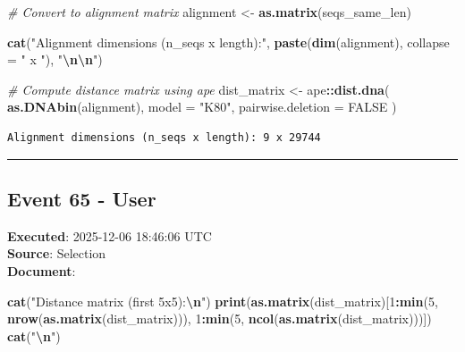 \documentclass[
  11pt,
]{article}
\newenvironment{Shaded}{\begin{snugshade}}{\end{snugshade}}
\newcommand{\AttributeTok}[1]{\textcolor[rgb]{0.13,0.29,0.53}{#1}}
\newcommand{\CommentTok}[1]{\textcolor[rgb]{0.56,0.35,0.01}{\textit{#1}}}
\newcommand{\ConstantTok}[1]{\textcolor[rgb]{0.56,0.35,0.01}{#1}}
\newcommand{\DecValTok}[1]{\textcolor[rgb]{0.00,0.00,0.81}{#1}}
\newcommand{\FunctionTok}[1]{\textcolor[rgb]{0.13,0.29,0.53}{\textbf{#1}}}
\newcommand{\NormalTok}[1]{#1}
\newcommand{\OtherTok}[1]{\textcolor[rgb]{0.56,0.35,0.01}{#1}}
\newcommand{\SpecialCharTok}[1]{\textcolor[rgb]{0.81,0.36,0.00}{\textbf{#1}}}
\newcommand{\StringTok}[1]{\textcolor[rgb]{0.31,0.60,0.02}{#1}}
\newenvironment{rpoutput}{\vspace{0.5em}\begin{snugshade}}{\end{snugshade}}
\begin{document}
\begin{Shaded}
\begin{Highlighting}[]
\CommentTok{\# Convert to alignment matrix}
\NormalTok{alignment }\OtherTok{\textless{}{-}} \FunctionTok{as.matrix}\NormalTok{(seqs\_same\_len)}

\FunctionTok{cat}\NormalTok{(}\StringTok{"Alignment dimensions (n\_seqs x length):"}\NormalTok{, }\FunctionTok{paste}\NormalTok{(}\FunctionTok{dim}\NormalTok{(alignment), }\AttributeTok{collapse =} \StringTok{" x "}\NormalTok{), }\StringTok{"}\SpecialCharTok{\textbackslash{}n\textbackslash{}n}\StringTok{"}\NormalTok{)}

\CommentTok{\# Compute distance matrix using ape}
\NormalTok{dist\_matrix }\OtherTok{\textless{}{-}}\NormalTok{ ape}\SpecialCharTok{::}\FunctionTok{dist.dna}\NormalTok{(}
  \FunctionTok{as.DNAbin}\NormalTok{(alignment),}
  \AttributeTok{model =} \StringTok{"K80"}\NormalTok{,}
  \AttributeTok{pairwise.deletion =} \ConstantTok{FALSE}
\NormalTok{)}
\end{Highlighting}
\end{Shaded}

\begin{rpoutput}

\begin{verbatim}
Alignment dimensions (n_seqs x length): 9 x 29744 
\end{verbatim}

\end{rpoutput}

\begin{center}\rule{0.5\linewidth}{0.5pt}\end{center}

\subsection{Event 65 - User}\label{event-65---user}

\textbf{Executed}: 2025-12-06 18:46:06 UTC\\
\textbf{Source}: Selection\\
\textbf{Document}:

\begin{Shaded}
\begin{Highlighting}[]
\FunctionTok{cat}\NormalTok{(}\StringTok{"Distance matrix (first 5x5):}\SpecialCharTok{\textbackslash{}n}\StringTok{"}\NormalTok{)}
\FunctionTok{print}\NormalTok{(}\FunctionTok{as.matrix}\NormalTok{(dist\_matrix)[}\DecValTok{1}\SpecialCharTok{:}\FunctionTok{min}\NormalTok{(}\DecValTok{5}\NormalTok{, }\FunctionTok{nrow}\NormalTok{(}\FunctionTok{as.matrix}\NormalTok{(dist\_matrix))),}
                             \DecValTok{1}\SpecialCharTok{:}\FunctionTok{min}\NormalTok{(}\DecValTok{5}\NormalTok{, }\FunctionTok{ncol}\NormalTok{(}\FunctionTok{as.matrix}\NormalTok{(dist\_matrix)))])}
\FunctionTok{cat}\NormalTok{(}\StringTok{"}\SpecialCharTok{\textbackslash{}n}\StringTok{"}\NormalTok{)}
\end{Highlighting}
\end{Shaded}
\end{document}

